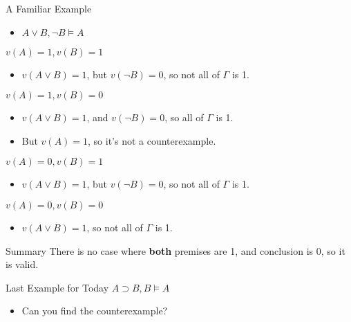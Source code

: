\documentclass[
  17pt,
  letterpaper,
  ignorenonframetext,
  aspectratio=169,
  handout]{beamer}
\providecommand{\tightlist}{%
  \setlength{\itemsep}{0pt}\setlength{\parskip}{0pt}}\usepackage{longtable,booktabs,array}
\begin{document}
\begin{frame}{A Familiar Example}
\protect\hypertarget{a-familiar-example}{}
\begin{itemize}[<+->]
\tightlist
\item
  \(A \vee B, \neg B \vDash A\)
\end{itemize}
\end{frame}

\begin{frame}{\(v(A) = 1, v(B) = 1\)}
\protect\hypertarget{va-1-vb-1-1}{}
\begin{itemize}[<+->]
\tightlist
\item
  \(v(A \vee B) = 1\), but \(v(\neg B) = 0\), so not all of \(\Gamma\)
  is 1.
\end{itemize}
\end{frame}

\begin{frame}{\(v(A) = 1, v(B) = 0\)}
\protect\hypertarget{va-1-vb-0-1}{}
\begin{itemize}[<+->]
\tightlist
\item
  \(v(A \vee B) = 1\), and \(v(\neg B) = 0\), so all of \(\Gamma\) is 1.
\item
  But \(v(A) = 1\), so it's not a counterexample.
\end{itemize}
\end{frame}

\begin{frame}{\(v(A) = 0, v(B) = 1\)}
\protect\hypertarget{va-0-vb-1-1}{}
\begin{itemize}[<+->]
\tightlist
\item
  \(v(A \vee B) = 1\), but \(v(\neg B) = 0\), so not all of \(\Gamma\)
  is 1.
\end{itemize}
\end{frame}

\begin{frame}{\(v(A) = 0, v(B) = 0\)}
\protect\hypertarget{va-0-vb-0-1}{}
\begin{itemize}[<+->]
\tightlist
\item
  \(v(A \vee B) = 1\), so not all of \(\Gamma\) is 1.
\end{itemize}
\end{frame}

\begin{frame}{Summary}
\protect\hypertarget{summary-1}{}
There is no case where \textbf{both} premises are 1, and conclusion is
0, so it is valid.
\end{frame}

\begin{frame}{Last Example for Today}
\protect\hypertarget{last-example-for-today}{}
\(A \supset B, B \vDash A\)

\begin{itemize}[<+->]
\tightlist
\item
  Can you find the counterexample?
\end{itemize}
\end{frame}
\end{document}
